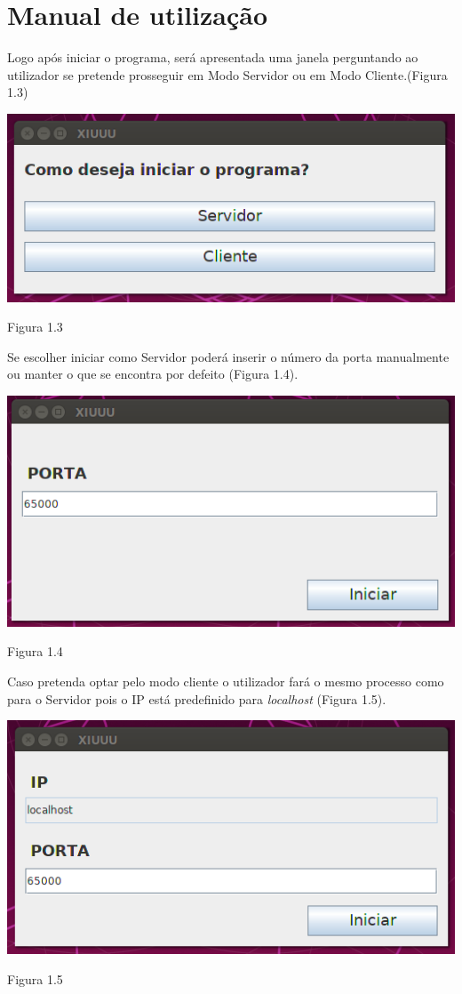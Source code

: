 \section{Manual de utilização}
\label{chap4:sec:manual}
Logo após iniciar o programa, será apresentada uma janela perguntando ao utilizador se pretende prosseguir em Modo Servidor ou em Modo Cliente.(Figura 1.3) 
\newline\begin{center}\includegraphics[scale=0.4]{img/inicio.png}\newline\caption{Figura 1.3}\end{center}
Se escolher iniciar como Servidor poderá inserir o número da porta manualmente ou manter o que se encontra por defeito (Figura 1.4).  
\newline\begin{center}\includegraphics[scale=0.5, caption=Legenda]{img/startServer.png}\newline\caption{Figura 1.4}\end{center}
Caso pretenda optar pelo modo cliente o utilizador fará o mesmo processo como para o Servidor pois o IP está predefinido para  \textit{localhost} (Figura 1.5).
\newline\begin{center}\includegraphics[scale=0.5]{img/startClient.png}\newline\caption{Figura 1.5}\end{center} 

